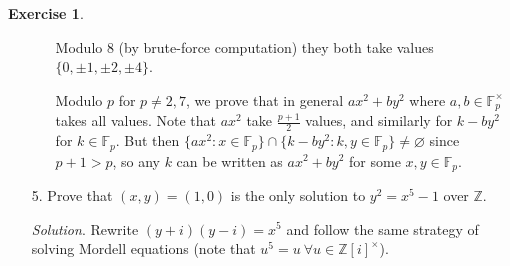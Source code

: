 \documentclass{article}
\newcommand{\Z}{\mathbb{Z}}
\newcommand{\F}{\mathbb{F}}
\theoremstyle{definition}
\newtheorem{exe}[defn]{Exercise}
\begin{document}
\begin{exe}
\begin{enumerate}
\begin{enumerate}
Modulo 8 (by brute-force computation) they both take values $\{0,\pm 1,\pm 2,\pm 4\}$.

Modulo $p$ for $p\neq 2,7$, we prove that in general $ax^2+by^2$ where $a,b\in\F_p^\times$ takes all values. Note that $ax^2$ take $\frac{p+1}{2}$ values, and similarly for $k-by^2$ for $k\in\F_p$. But then $\{ax^2:x\in\F_p\}\cap\{k-by^2:k,y\in\F_p\}\neq\varnothing$ since $p+1>p$, so any $k$ can be written as $ax^2+by^2$ for some $x,y\in\F_p$.
\end{enumerate}

\item[5.] Prove that $(x,y)=(1,0)$ is the only solution to $y^2=x^5-1$ over $\Z$.

\textit{Solution}. Rewrite $(y+i)(y-i)=x^5$ and follow the same strategy of solving Mordell equations (note that $u^5=u \ \forall u\in\Z[i]^\times$).
\end{enumerate}
\end{exe}
\end{document}
